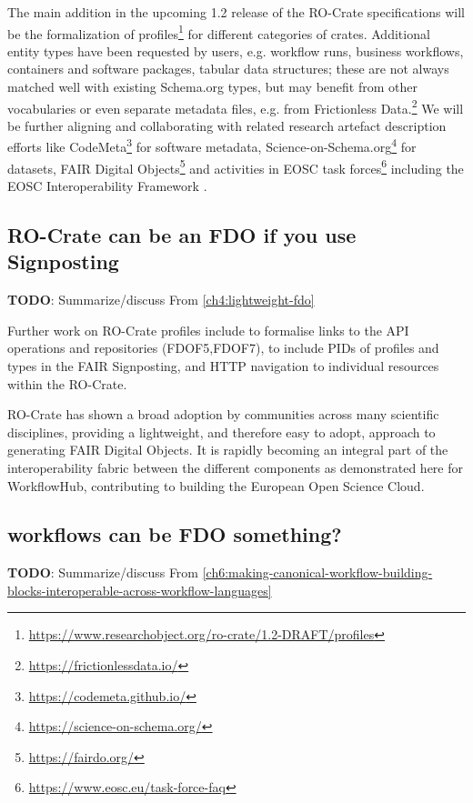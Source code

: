 The main addition in the upcoming 1.2 release of the RO-Crate
specifications will be the formalization of
profiles\footnote{\url{https://www.researchobject.org/ro-crate/1.2-DRAFT/profiles}}
for different categories of crates. Additional entity types have been
requested by users, e.g. workflow runs, business workflows, containers
and software packages, tabular data structures; these are not always
matched well with existing Schema.org types, but may benefit from other
vocabularies or even separate metadata files, e.g. from Frictionless
Data.\footnote{\url{https://frictionlessdata.io/}} We will be further aligning
and collaborating with related research artefact description efforts
like CodeMeta\footnote{\url{https://codemeta.github.io/}} for software metadata,
Science-on-Schema.org\footnote{\url{https://science-on-schema.org/}}
\cite{ch5-66} for datasets, FAIR Digital
Objects\footnote{\url{https://fairdo.org/}} \cite{De Smedt 2020} and
activities in EOSC task forces\footnote{\url{https://www.eosc.eu/task-force-faq}}
including the EOSC Interoperability Framework \cite{eosc-interop-framework}.




\subsection{RO-Crate can be an FDO if you use Signposting}

\textbf{TODO}: Summarize/discuss 
From \vref{ch4:lightweight-fdo}

Further work on RO-Crate profiles include to formalise links to the API
operations and repositories (FDOF5,FDOF7), to include PIDs of
profiles and types in the FAIR Signposting, and HTTP navigation to
individual resources within the RO-Crate.

RO-Crate has shown a broad adoption by communities across many
scientific disciplines, providing a lightweight, and therefore easy to
adopt, approach to generating FAIR Digital Objects. It is rapidly
becoming an integral part of the interoperability fabric between the
different components as demonstrated here for WorkflowHub, contributing
to building the European Open Science Cloud.


\subsection{workflows can be FDO something?}

\textbf{TODO}: Summarize/discuss 
From \vref{ch6:making-canonical-workflow-building-blocks-interoperable-across-workflow-languages}

